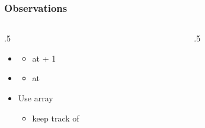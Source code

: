 \documentclass[aspectratio=169,10pt,compress]{beamer}
\begin{document}
\begin{frame}\frametitle{Observations}
	\begin{columns}[T] %
	\begin{column}{.5\linewidth} %
		\begin{itemize}
			\item
				\begin{itemize}
					\item 
					at   + 1
				\end{itemize}			

			\item
				\begin{itemize}
					\item 
					at  
				\end{itemize}			
			\item
			Use array
				\begin{itemize}
					\item 
					keep track of  
				\end{itemize}			
		\end{itemize}
	\end{column} %
	\begin{column}{.5\linewidth} %
	

\end{column}
\end{columns}
\end{frame}
\end{document}
